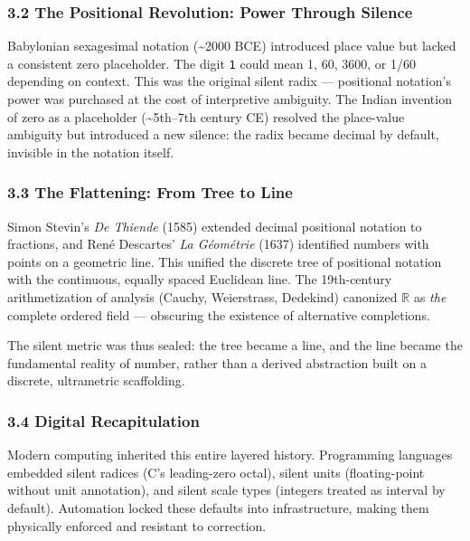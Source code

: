 \documentclass[
]{article}
\begin{document}
\subsubsection{3.2 The Positional Revolution: Power Through
Silence}\label{the-positional-revolution-power-through-silence}

Babylonian sexagesimal notation (\textasciitilde2000 BCE) introduced
place value but lacked a consistent zero placeholder. The digit
\texttt{1} could mean 1, 60, 3600, or 1/60 depending on context. This
was the original silent radix --- positional notation's power was
purchased at the cost of interpretive ambiguity. The Indian invention of
zero as a placeholder (\textasciitilde5th--7th century CE) resolved the
place-value ambiguity but introduced a new silence: the radix became
decimal by default, invisible in the notation itself.

\subsubsection{3.3 The Flattening: From Tree to
Line}\label{the-flattening-from-tree-to-line}

Simon Stevin's \emph{De Thiende} (1585) extended decimal positional
notation to fractions, and René Descartes' \emph{La Géométrie} (1637)
identified numbers with points on a geometric line. This unified the
discrete tree of positional notation with the continuous, equally spaced
Euclidean line. The 19th-century arithmetization of analysis (Cauchy,
Weierstrass, Dedekind) canonized \(\mathbb{R}\) as \emph{the} complete
ordered field --- obscuring the existence of alternative completions.

The silent metric was thus sealed: the tree became a line, and the line
became the fundamental reality of number, rather than a derived
abstraction built on a discrete, ultrametric scaffolding.

\subsubsection{3.4 Digital Recapitulation}\label{digital-recapitulation}

Modern computing inherited this entire layered history. Programming
languages embedded silent radices (C's leading-zero octal), silent units
(floating-point without unit annotation), and silent scale types
(integers treated as interval by default). Automation locked these
defaults into infrastructure, making them physically enforced and
resistant to correction.
\end{document}
